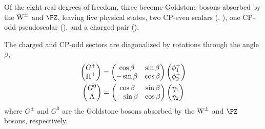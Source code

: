 Of the eight real degrees of freedom, three become Goldstone bosons absorbed by the $\text{W}^\pm$ and $\PZ$, leaving five physical states, two CP-even scalars (\Ph, \PH), one CP-odd pseudoscalar (\PA), and a charged pair (\PHpm).

The charged and CP-odd sectors are diagonalized by rotations through the angle $\beta$,
\begin{gather}
\begin{pmatrix} G^+ \\ \text{H}^+ \end{pmatrix}
=
\begin{pmatrix} \cos\beta & \sin\beta \\ -\sin\beta & \cos\beta \end{pmatrix}
\begin{pmatrix} \phi_1^+ \\ \phi_2^+ \end{pmatrix}
\label{eq:charged_rotation} \\
\begin{pmatrix} G^0 \\ \text{A} \end{pmatrix}
=
\begin{pmatrix} \cos\beta & \sin\beta \\ -\sin\beta & \cos\beta \end{pmatrix}
\begin{pmatrix} \eta_1 \\ \eta_2 \end{pmatrix}
\label{eq:cpodd_rotation}
\end{gather}
where $G^\pm$ and $G^0$ are the Goldstone bosons absorbed by the $\text{W}^\pm$ and $\PZ$ bosons, respectively.


